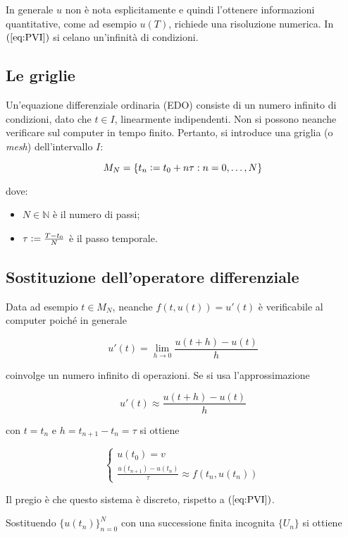 \documentclass[hidelinks, 10pt]{report}
\begin{document}
In generale $ u $ non \`e nota esplicitamente e quindi l'ottenere informazioni quantitative, come ad esempio $ u(T) $, richiede una risoluzione numerica. In $ (\ref{eq:PVI}) $ si celano un'infinit\`a di condizioni.

\subsection{Le griglie}
Un'equazione differenziale ordinaria (EDO) consiste di un numero infinito di condizioni, dato che $ t \in I $, linearmente indipendenti. Non si possono neanche verificare sul computer in tempo finito. Pertanto, si introduce una griglia (o \emph{mesh}) dell'intervallo $ I $:

\[ M_{N} = \{ t_{n} \vcentcolon= t_{0} + n \tau : n = 0, \dotsc, N \} \]

dove:
\begin{itemize}
\item $ N \in \mathbb{N} $ \`e il numero di passi;
\item $ \tau \vcentcolon= \frac{T - t_{0}}{N} $ \`e il passo temporale.
\end{itemize}


\subsection{Sostituzione dell'operatore differenziale}
Data ad esempio $ t \in M_{N} $, neanche $ f \left( t, u(t) \right) = u'(t) $ \`e verificabile al computer poich\'e in generale

\[ u'(t) = \lim\limits_{h \to 0} \frac{u(t + h) - u(t)}{h} \]

coinvolge un numero infinito di operazioni. Se si usa l'approssimazione

\[ u'(t) \approx \frac{u(t + h) - u(t)}{h} \]

con $ t = t_{n} $ e $ h = t_{n + 1} - t_{n} = \tau $ si ottiene

\[
\begin{cases}
u(t_{0}) = v \\
\frac{u(t_{n + 1}) - u(t_{n})}{\tau} \approx f \left( t_{n}, u(t_{n}) \right)
\end{cases}
\]

Il pregio \`e che questo sistema \`e discreto, rispetto a $ (\ref{eq:PVI}) $.

Sostituendo $ \{ u(t_{n}) \}_{n = 0}^{N} $ con una successione finita incognita $ \{ U_{n} \} $ si ottiene
\end{document}
